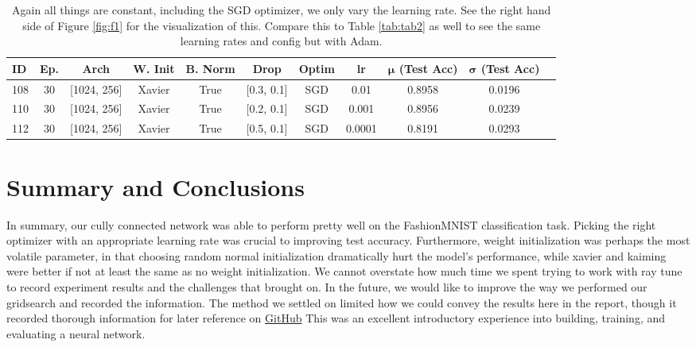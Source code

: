 \documentclass[11pt]{amsart}
\begin{document}
\begin{table}[h]
    \centering
    \begin{tabular}{|l|c|c|c|c|c|c|c|c|c|c|} %
        \hline
        \textbf{ID} & \textbf{Ep.}
        & \textbf{Arch} & \textbf{W. Init}
        & \textbf{B. Norm} & \textbf{Drop}
        & \textbf{Optim} & \textbf{lr}
	& \textbf{$\bm \mu$ (Test Acc)}
        & \textbf{$\bm \sigma$ (Test Acc)} \\ 
        \hline
        108 & 30 & [1024, 256]  & Xavier & True & [0.3, 0.1] & SGD & 0.01 & 0.8958 & 0.0196 \\
        \hline
        110 & 30 & [1024, 256]  & Xavier & True & [0.2, 0.1] & SGD & 0.001 & 0.8956 & 0.0239 \\
        \hline
        112 & 30 & [1024, 256]  & Xavier & True & [0.5, 0.1] & SGD & 0.0001 & 0.8191 & 0.0293 \\  
        \hline
    \end{tabular}
    \caption{
    Again all things are constant, including the SGD optimizer, we only vary the learning rate.
    See the right hand side of Figure \ref{fig:f1} for the visualization of this.
    Compare this to Table \ref{tab:tab2} as well to see the same learning rates and config but with Adam.
    }
    \label{tab:tab3}
\end{table}


\section{Summary and Conclusions}\label{sec:conclusions} 
In summary, our cully connected network was able to perform pretty well on the FashionMNIST classification task.
Picking the right optimizer with an appropriate learning rate was crucial to improving test accuracy.
Furthermore, weight initialization was perhaps the most volatile parameter, in that choosing random normal initialization dramatically hurt the model's performance, while xavier and kaiming were better if not at least the same as no weight initialization.
We cannot overstate how much time we spent trying to work with ray tune to record experiment results and the challenges that brought on.
In the future, we would like to improve the way we performed our gridsearch and recorded the information.
The method we settled on limited how we could convey the results here in the report, though it recorded thorough information for later reference on \href{https://github.com/hunter-lybbert/uw-central/blob/main/data_analysis/hw_04/experiments/experiments.json}{GitHub}
This was an excellent introductory experience into building, training, and evaluating a neural network.
\end{document}

